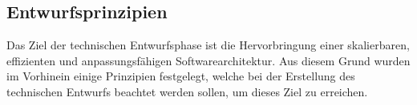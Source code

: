 			\subsection{Entwurfsprinzipien}
			Das Ziel der technischen Entwurfsphase ist die Hervorbringung einer skalierbaren, effizienten und anpassungsfähigen Softwarearchitektur. Aus diesem Grund wurden im Vorhinein einige Prinzipien festgelegt, welche bei der Erstellung des technischen Entwurfs beachtet werden sollen, um dieses Ziel zu erreichen.
